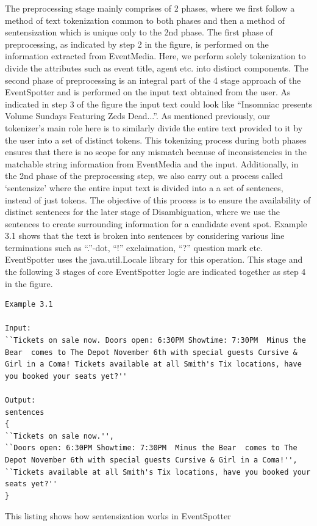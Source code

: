 \documentclass[a4paper,11pt]{report}
\begin{document}
The preprocessing stage mainly comprises of 2 phases, where we first follow a method of text tokenization common to both phases and then a method of sentensization which is unique only to the 2nd phase. The first phase of preprocessing, as indicated by step 2 in the figure, is performed on the information extracted from EventMedia. Here, we perform solely tokenization to divide the attributes such as event title, agent etc. into distinct components. The second phase of preprocessing is an integral part of the 4 stage approach of the EventSpotter and is performed on the input text obtained from the user. As indicated in step 3 of the figure the input text could look like ``Insomniac presents Volume Sundays Featuring Zeds Dead...''.  As mentioned previously, our tokenizer's main role here is to similarly divide the entire text provided to it by the user into a set of distinct tokens. This tokenizing process during both phases ensures that there is no scope for any mismatch because of inconsistencies in the matchable string information from EventMedia and the input. Additionally, in the 2nd phase of the preprocessing step, we also carry out a process called `sentensize' where the entire input text is divided into a a set of sentences, instead of just tokens. The objective of this process is to ensure the availability of distinct sentences for the later stage of Disambiguation, where we use the sentences to create surrounding information for a candidate event spot. Example 3.1 shows that the text is broken into sentences by considering various line terminations such as ``.''-dot, ``!'' exclaimation, ``?'' question mark etc.
EventSpotter uses the java.util.Locale library for this operation. This stage and the following 3 stages of core EventSpotter logic are indicated together as step 4 in the figure. \newline
\newline
\begin{lstlisting}
Example 3.1

Input:
``Tickets on sale now. Doors open: 6:30PM Showtime: 7:30PM  Minus the Bear  comes to The Depot November 6th with special guests Cursive & Girl in a Coma! Tickets available at all Smith's Tix locations, have you booked your seats yet?''

Output:
sentences
{
``Tickets on sale now.'', 
``Doors open: 6:30PM Showtime: 7:30PM  Minus the Bear  comes to The Depot November 6th with special guests Cursive & Girl in a Coma!'',
``Tickets available at all Smith's Tix locations, have you booked your seats yet?''
}
\end{lstlisting}
This listing shows how sentensization works in EventSpotter \newline
\end{document}
